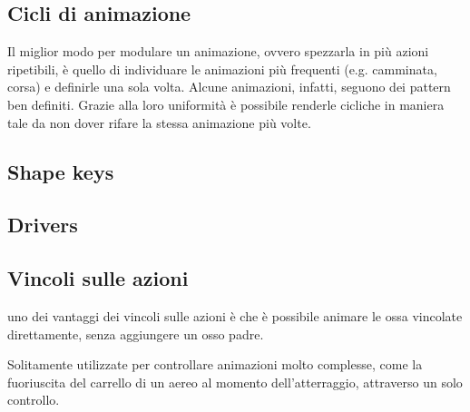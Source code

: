 \subsection{Cicli di animazione}
Il miglior modo per modulare un animazione, ovvero spezzarla in più azioni ripetibili, è quello di individuare le animazioni più frequenti (e.g. camminata, corsa) e definirle una sola volta.
Alcune animazioni, infatti, seguono dei pattern ben definiti.
Grazie alla loro uniformità è possibile renderle cicliche in maniera tale da non dover rifare la stessa animazione più volte.
\subsection{Shape keys}
\subsection{Drivers}
\subsection{Vincoli sulle azioni}
uno dei vantaggi dei vincoli sulle azioni è che è possibile animare le ossa vincolate direttamente, senza aggiungere un osso padre.

Solitamente utilizzate per controllare animazioni molto complesse, come la fuoriuscita del carrello di un aereo al momento dell'atterraggio, attraverso un solo controllo.
